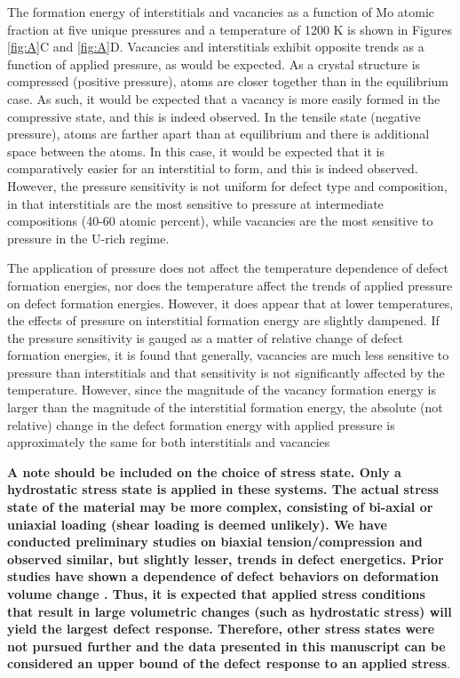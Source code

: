 \documentclass[review]{elsarticle}
\providecommand{\DIFadd}[1]{{\bf #1}} %
\providecommand{\DIFaddbegin}{\protect\color{blue}} %
\providecommand{\DIFaddend}{\protect\color{black}} %
\newcommand{\DIFaddincludegraphics}[2][]{{\color{blue}\fbox{\DIFOincludegraphics[#1]{#2}}}} %
\DeclareRobustCommand{\DIFaddbegin}{\DIFOaddbegin \let\includegraphics\DIFaddincludegraphics} %
\DeclareRobustCommand{\DIFaddend}{\DIFOaddend \let\includegraphics\DIFOincludegraphics} %
\begin{document}
The formation energy of interstitials and vacancies as a function of Mo atomic fraction at five unique pressures and a temperature of 1200 K is shown in Figures \ref{fig:A}C and \ref{fig:A}D. Vacancies and interstitials exhibit opposite trends as a function of applied pressure, as would be expected. As a crystal structure is compressed (positive pressure), atoms are closer together than in the equilibrium case. As such, it would be expected that a vacancy is more easily formed in the compressive state, and this is indeed observed. In the tensile state (negative pressure), atoms are farther apart than at equilibrium and there is additional space between the atoms. In this case, it would be expected that it is comparatively easier for an interstitial to form, and this is indeed observed. However, the pressure sensitivity is not uniform for defect type and composition, in that interstitials are the most sensitive to pressure at intermediate compositions (40-60 atomic percent), while vacancies are the most sensitive to pressure in the U-rich regime. 

The application of pressure does not affect the temperature dependence of defect formation energies, nor does the temperature affect the trends of applied pressure on defect formation energies. However, it does appear that at lower temperatures, the effects of pressure on interstitial formation energy are slightly dampened. If the pressure sensitivity is gauged as a matter of relative change of defect formation energies, it is found that generally, vacancies are much less sensitive to pressure than interstitials and that sensitivity is not significantly affected by the temperature. However, since the magnitude of the vacancy formation energy is larger than the magnitude of the interstitial formation energy, the absolute (not relative) change in the defect formation energy with applied pressure is approximately the same for both interstitials and vacancies\DIFaddbegin \DIFadd{. 
}

\DIFadd{A note should be included on the choice of stress state. Only a hydrostatic stress state is applied in these systems. The actual stress state of the material may be more complex, consisting of bi-axial or uniaxial loading (shear loading is deemed unlikely). We have conducted preliminary studies on biaxial tension/compression and observed similar, but slightly lesser, trends in defect energetics. Prior studies have shown a dependence of defect behaviors on deformation volume change \cite{beeler2015,beeler2016}. Thus, it is expected that applied stress conditions that result in large volumetric changes (such as hydrostatic stress) will yield the largest defect response. Therefore, other stress states were not pursued further and the data presented in this manuscript can be considered an upper bound of the defect response to an applied stress}\DIFaddend .
\end{document}
